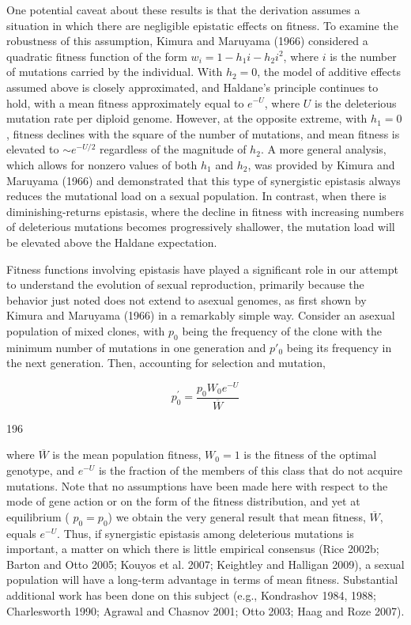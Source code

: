 \documentclass{article}
\begin{document}
One potential caveat about these results is that the derivation assumes a situation in which there are negligible epistatic effects on fitness. To examine the robustness of this assumption, Kimura and Maruyama (1966) considered a quadratic fitness function of the form  $ w_i = 1 - h_1 i - h_2 i^2 $, where  $ i $ is the number of mutations carried by the individual. With  $ h_2 = 0 $, the model of additive effects assumed above is closely approximated, and Haldane's principle continues to hold, with a mean fitness approximately equal to  $ e^{-U} $, where  $ U $ is the deleterious mutation rate per diploid genome. However, at the opposite extreme, with  $ h_1 = 0 $, fitness declines with the square of the number of mutations, and mean fitness is elevated to  $ \sim e^{-U/2} $ regardless of the magnitude of  $ h_2 $. A more general analysis, which allows for nonzero values of both  $ h_1 $ and  $ h_2 $, was provided by Kimura and Maruyama (1966) and demonstrated that this type of synergistic epistasis always reduces the mutational load on a sexual population. In contrast, when there is diminishing-returns epistasis, where the decline in fitness with increasing numbers of deleterious mutations becomes progressively shallower, the mutation load will be elevated above the Haldane expectation.

Fitness functions involving epistasis have played a significant role in our attempt to understand the evolution of sexual reproduction, primarily because the behavior just noted does not extend to asexual genomes, as first shown by Kimura and Maruyama (1966) in a remarkably simple way. Consider an asexual population of mixed clones, with  $ p_0 $ being the frequency of the clone with the minimum number of mutations in one generation and  $ p'_0 $ being its frequency in the next generation. Then, accounting for selection and mutation,

\begin{equation}
p_{0}^{\prime}=\frac{p_{0}W_{0}e^{-U}}{\overline{W}}
\tag{7.41}
\label{eq:7_41}
\end{equation}

196

where  $ \overline{W} $ is the mean population fitness,  $ W_0 = 1 $ is the fitness of the optimal genotype, and  $ e^{-U} $ is the fraction of the members of this class that do not acquire mutations. Note that no assumptions have been made here with respect to the mode of gene action or on the form of the fitness distribution, and yet at equilibrium ( $ p_0 = p_0 $) we obtain the very general result that mean fitness,  $ \overline{W} $, equals  $ e^{-U} $. Thus, if synergistic epistasis among deleterious mutations is important, a matter on which there is little empirical consensus (Rice 2002b; Barton and Otto 2005; Kouyos et al. 2007; Keightley and Halligan 2009), a sexual population will have a long-term advantage in terms of mean fitness. Substantial additional work has been done on this subject (e.g., Kondrashov 1984, 1988; Charlesworth 1990; Agrawal and Chasnov 2001; Otto 2003; Haag and Roze 2007).
\end{document}
